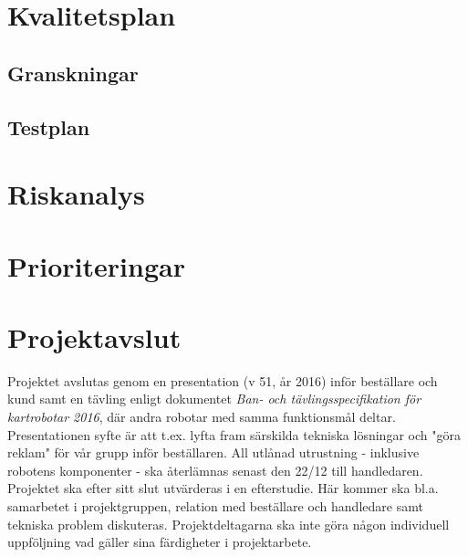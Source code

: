 \documentclass{article}
\begin{document}
\section{Kvalitetsplan}

\subsection{Granskningar}
\subsection{Testplan}

\section{Riskanalys}
\section{Prioriteringar}
\section{Projektavslut}
Projektet avslutas genom en presentation (v 51, år 2016) inför beställare och kund samt en tävling enligt dokumentet \textit{Ban- och tävlingsspecifikation för kartrobotar 2016}, där andra robotar med samma funktionsmål deltar. Presentationen syfte är att t.ex. lyfta fram särskilda tekniska lösningar och "göra reklam" för vår grupp inför beställaren. All utlånad utrustning - inklusive robotens komponenter - ska återlämnas senast den 22/12 till handledaren. Projektet ska efter sitt slut utvärderas i en efterstudie. Här kommer ska bl.a. samarbetet i projektgruppen, relation med beställare och handledare samt tekniska problem diskuteras. Projektdeltagarna ska inte göra någon individuell uppföljning vad gäller sina färdigheter i projektarbete.
\end{document}
